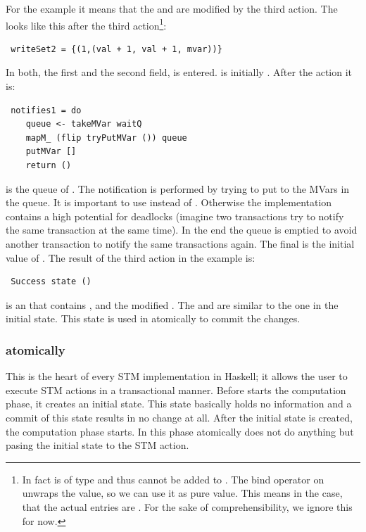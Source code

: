 For the example it means that the  and  are modified by the third 
action. The  looks like this after the third action\footnote{In fact  
is of type  and thus cannot be added to . The bind operator on 
unwraps the value, so we can use it as pure value. This means in the case, that the actual entries are
. For the sake of comprehensibility, we ignore this for now.}:
\begin{lstlisting}
 writeSet2 = {(1,(val + 1, val + 1, mvar))} 
\end{lstlisting}
In both, the first and the second field,  is entered.  is 
initially . After the  action it is:
\begin{lstlisting}
 notifies1 = do
    queue <- takeMVar waitQ
    mapM_ (flip tryPutMVar ()) queue
    putMVar []
    return ()
\end{lstlisting}
 is the queue of . The notification is performed by trying to put \code{()}
to the MVars in the queue. It is important to use  instead of .
Otherwise the implementation contains a high potential for deadlocks (imagine two transactions try to notify the same 
transaction at the same time). In the end the queue is emptied to avoid another transaction to 
notify the same transactions again. The final  is the initial value of 
. The result of the third action in the example is:
\begin{lstlisting}
 Success state ()
\end{lstlisting}
 is an  that contains ,  and the 
modified . The  and  are similar to the one 
in the initial state. This state is used in atomically to commit the changes.


\subsubsection{atomically}
This is the heart of every STM implementation in Haskell; it allows the user to execute STM 
actions in a transactional manner. Before  starts the computation phase, it
creates an initial state. This state basically holds no information and a commit of this state
results in no change at all. After the initial state is created, the computation phase starts. 
In this phase atomically does not do anything but pasing the initial state to the STM action.

